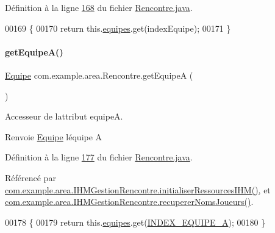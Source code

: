 Définition à la ligne \hyperlink{_rencontre_8java_source_l00168}{168} du fichier \hyperlink{_rencontre_8java_source}{Rencontre.\+java}.


\begin{DoxyCode}
00169     \{
00170         \textcolor{keywordflow}{return} this.\hyperlink{classcom_1_1example_1_1area_1_1_rencontre_accbafe5a878f457fb7119cfd55401c86}{equipes}.get(indexEquipe);
00171     \}
\end{DoxyCode}
\mbox{\label{classcom_1_1example_1_1area_1_1_rencontre_a207498fd691285b28b0a720da0a660f8}} 
\paragraph{\texorpdfstring{get\+Equipe\+A()}{getEquipeA()}}
{\footnotesize\ttfamily \hyperlink{classcom_1_1example_1_1area_1_1_equipe}{Equipe} com.\+example.\+area.\+Rencontre.\+get\+EquipeA (\begin{DoxyParamCaption}{ }\end{DoxyParamCaption})}



Accesseur de l\textquotesingle{}attribut equipeA. 

\begin{DoxyReturn}{Renvoie}
\hyperlink{classcom_1_1example_1_1area_1_1_equipe}{Equipe} l\textquotesingle{}équipe A 
\end{DoxyReturn}


Définition à la ligne \hyperlink{_rencontre_8java_source_l00177}{177} du fichier \hyperlink{_rencontre_8java_source}{Rencontre.\+java}.



Référencé par \hyperlink{_i_h_m_gestion_rencontre_8java_source_l00142}{com.\+example.\+area.\+I\+H\+M\+Gestion\+Rencontre.\+initialiser\+Ressources\+I\+H\+M()}, et \hyperlink{_i_h_m_gestion_rencontre_8java_source_l00281}{com.\+example.\+area.\+I\+H\+M\+Gestion\+Rencontre.\+recuperer\+Noms\+Joueurs()}.


\begin{DoxyCode}
00178     \{
00179         \textcolor{keywordflow}{return} this.\hyperlink{classcom_1_1example_1_1area_1_1_rencontre_accbafe5a878f457fb7119cfd55401c86}{equipes}.get(\hyperlink{classcom_1_1example_1_1area_1_1_rencontre_a673930c3156037739c3fa2aa335033d7}{INDEX\_EQUIPE\_A});
00180     \}
\end{DoxyCode}
\mbox{\label{classcom_1_1example_1_1area_1_1_rencontre_a83deec026e26407049c5671672291170}} 
